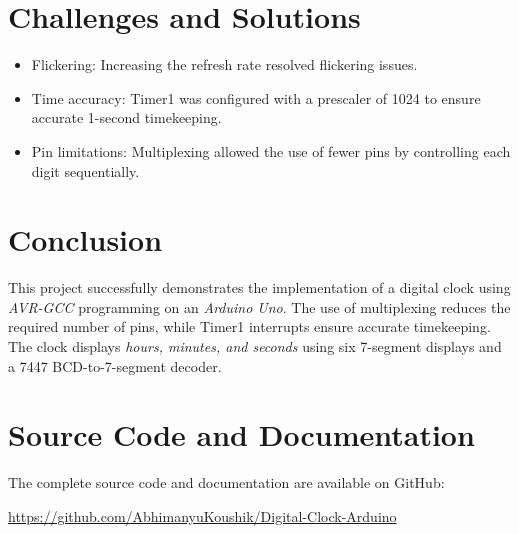 \documentclass{article}
\begin{document}
\section{Challenges and Solutions}
\begin{itemize}
    \item Flickering: Increasing the refresh rate resolved flickering issues.
    \item Time accuracy: Timer1 was configured with a prescaler of 1024 to ensure accurate 1-second timekeeping.
    \item Pin limitations: Multiplexing allowed the use of fewer pins by controlling each digit sequentially.
\end{itemize}

\section{Conclusion}
This project successfully demonstrates the implementation of a digital clock using \textit{AVR-GCC} programming on an \textit{Arduino Uno}. The use of multiplexing reduces the required number of pins, while Timer1 interrupts ensure accurate timekeeping. The clock displays \textit{hours, minutes, and seconds} using six 7-segment displays and a 7447 BCD-to-7-segment decoder.

\section{Source Code and Documentation}
The complete source code and documentation are available on GitHub:
\begin{center}
\href{https://github.com/AbhimanyuKoushik/nice_stuff/tree/main/codes/Arduino/Clock/clock_Decoder}{https://github.com/AbhimanyuKoushik/Digital-Clock-Arduino}
\end{center}
\end{document}
